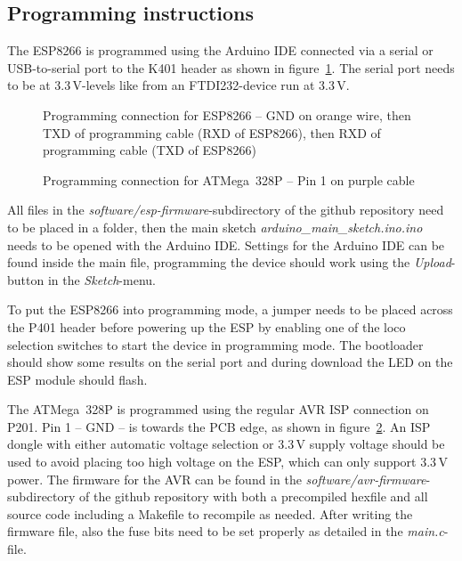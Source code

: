 \documentclass[11pt,a4paper]{scrartcl}
\begin{document}
\subsection{Programming instructions}

The ESP8266 is programmed using the Arduino IDE connected via a serial or USB-to-serial port to the K401 header as shown in figure~\ref{progESP}. The serial port needs to be at 3.3\,V-levels like from an FTDI232-device run at 3.3\,V.

\begin{figure}[tbh]
  \centering
  \caption{Programming connection for ESP8266 -- GND on orange wire, then TXD of programming cable (RXD of ESP8266), then RXD of programming cable (TXD of ESP8266)}
  \label{progESP}
\end{figure}

\begin{figure}[tbh]
  \centering
  \caption{Programming connection for ATMega~328P -- Pin 1 on purple cable}
  \label{progAVR}
\end{figure}

All files in the \textit{software/esp-firmware}-subdirectory of the github repository need to be placed in a folder, then the main sketch \textit{arduino\_main\_sketch.ino.ino} needs to be opened with the Arduino IDE. Settings for the Arduino IDE can be found inside the main file, programming the device should work using the \textit{Upload}-button in the \textit{Sketch}-menu.

To put the ESP8266 into programming mode, a jumper needs to be placed across the P401 header before powering up the ESP by enabling one of the loco selection switches to start the device in programming mode. The bootloader should show some results on the serial port and during download the LED on the ESP module should flash.

The ATMega~328P is programmed using the regular AVR ISP connection on P201. Pin 1 -- GND -- is towards the PCB edge, as shown in figure~\ref{progAVR}. An ISP dongle with either automatic voltage selection or 3.3\,V supply voltage should be used to avoid placing too high voltage on the ESP, which can only support 3.3\,V power. The firmware for the AVR can be found in the \textit{software/avr-firmware}-subdirectory of the github repository with both a precompiled hexfile and all source code including a Makefile to recompile as needed. After writing the firmware file, also the fuse bits need to be set properly as detailed in the \textit{main.c}-file.
\end{document}
